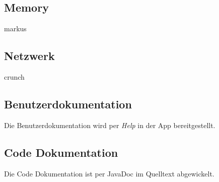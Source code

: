 \documentclass[11pt,a4paper]{article}
\begin{document}
\subsection{Memory}
markus
\subsection{Netzwerk}
crunch

\subsection*{Benutzerdokumentation}

Die Benutzerdokumentation wird per {\em Help} in der App bereitgestellt. 

\subsection*{Code Dokumentation}

Die Code Dokumentation ist per JavaDoc im Quelltext abgewickelt.
\end{document}
